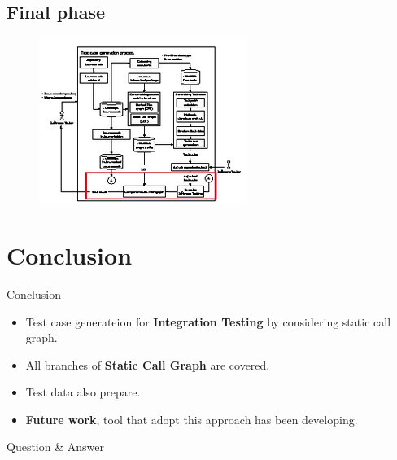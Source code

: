 \documentclass{beamer}
\begin{document}
\subsection{Final phase}
\begin{frame}
    \begin{figure}
        \includegraphics[height=0.8\paperheight]{figure/Methodology-Highlight-2}
    \end{figure}
\end{frame}

%
\section{Conclusion}
\begin{frame}{Conclusion}
    \begin{itemize}
        \item Test case generateion for \textbf{Integration Testing} by considering static call graph.
        \item All branches of \textbf{Static Call Graph} are covered.
        \item Test data also prepare.
        \item \textbf{Future work}, tool that adopt this approach has been developing.
    \end{itemize}
\end{frame}

%
\begin{frame}
    \Large{Question \& Answer}
\end{frame}
\end{document}
